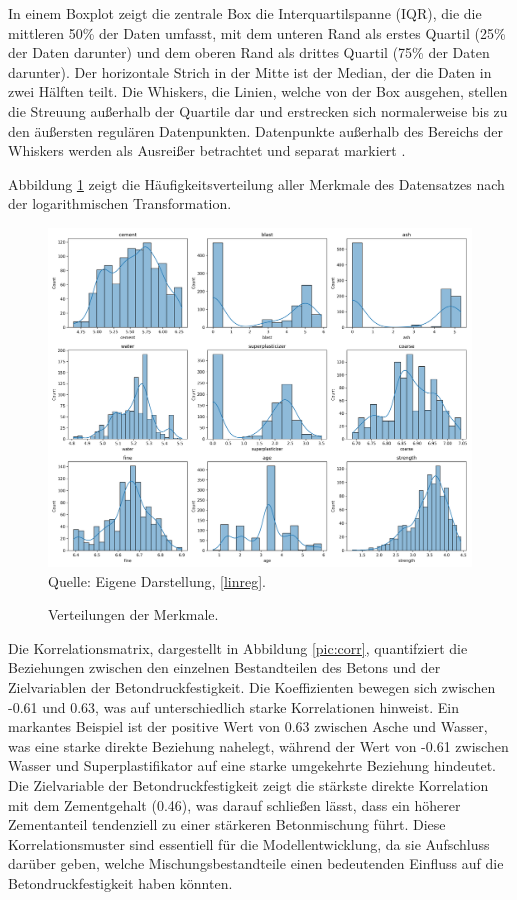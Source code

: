 In einem Boxplot zeigt die zentrale Box die Interquartilspanne (IQR), 
die die mittleren 50\% der Daten umfasst, mit dem unteren Rand als erstes Quartil 
(25\% der Daten darunter) und dem oberen Rand als drittes Quartil (75\% der Daten darunter). 
Der horizontale Strich in der Mitte ist der Median, der die Daten in zwei Hälften teilt. 
Die Whiskers, die Linien, welche von der Box ausgehen, stellen die Streuung außerhalb der Quartile dar und 
erstrecken sich normalerweise bis zu den äußersten regulären Datenpunkten. 
Datenpunkte außerhalb des Bereichs der Whiskers werden als Ausreißer betrachtet und separat markiert \cite[S. 43]{Molnar_2022}. 

Abbildung \ref{pic:hist} zeigt die Häufigkeitsverteilung aller Merkmale des Datensatzes 
nach der logarithmischen Transformation. 

\begin{figure}[!h]
    \caption{Verteilungen der Merkmale.}
    \includegraphics[width=1\textwidth]{../scripts/images/dist.png}
    Quelle: Eigene Darstellung, \ref{linreg}.
    \label{pic:hist}
\end{figure}

Die Korrelationsmatrix, dargestellt in Abbildung \ref{pic:corr}, 
quantifziert die Beziehungen zwischen den einzelnen Bestandteilen des Betons und der Zielvariablen der 
Betondruckfestigkeit. Die Koeffizienten bewegen sich zwischen -0.61 und 0.63, was auf 
unterschiedlich starke Korrelationen hinweist. Ein markantes Beispiel ist der positive Wert 
von 0.63 zwischen Asche und Wasser, was eine starke direkte Beziehung nahelegt, während der Wert 
von -0.61 zwischen Wasser und Superplastifikator auf eine starke umgekehrte Beziehung hindeutet. 
Die Zielvariable der Betondruckfestigkeit zeigt die stärkste direkte Korrelation mit dem Zementgehalt (0.46), 
was darauf schließen lässt, dass ein höherer Zementanteil tendenziell zu einer stärkeren Betonmischung führt. 
Diese Korrelationsmuster sind essentiell für die Modellentwicklung, da sie Aufschluss darüber geben, welche 
Mischungsbestandteile einen bedeutenden Einfluss auf die Betondruckfestigkeit haben könnten.

